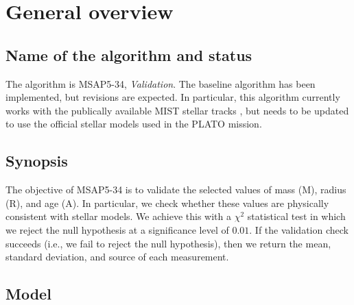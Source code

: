 \documentclass[a4paper, oneside, 11pt, article, english]{memoir}
\begin{document}
\clearpage
\chapter{General overview}
\label{chap:overview}

\section{Name of the algorithm and status}
\label{sec:name}
The algorithm is MSAP5-34, \emph{Validation}. 
The baseline algorithm has been implemented, but revisions are expected. 
In particular, this algorithm currently works with the publically available MIST stellar tracks \citep{MIST-I, MIST-II}, but needs to be updated to use the official stellar models used in the PLATO mission. 




\section{Synopsis}
\label{sec:synopsis}

The objective of MSAP5-34 is to validate the selected values of mass (M), radius (R), and age (A). 
In particular, we check whether these values are physically consistent with stellar models. 
We achieve this with a $\chi^2$ statistical test in which we reject the null hypothesis at a significance level of $0.01$. 
If the validation check succeeds (i.e., we fail to reject the null hypothesis), then we return the mean, standard deviation, and source of each measurement. 





\section{Model}
\label{sec:model}
\end{document}
